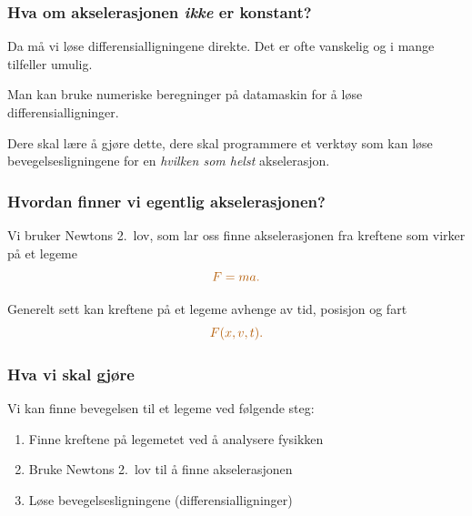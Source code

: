 \documentclass[english, 12pt]{beamer}
\newcommand{\alrt}{\color{AlertColor}}
\begin{document}
\begin{frame}
\frametitle{Hva om akselerasjonen \emph{ikke} er konstant?}

Da må vi løse differensialligningene direkte. Det er ofte vanskelig og i mange tilfeller umulig.

\vspace{1cm}

 {
Man kan bruke numeriske beregninger på datamaskin for å løse differensialligninger.
}

\vspace{1cm}

 {
Dere skal lære å gjøre dette, dere skal programmere et verktøy som kan løse bevegelsesligningene for en \emph{hvilken som helst} akselerasjon.
}
\end{frame}

\begin{frame}
\frametitle{Hvordan finner vi egentlig akselerasjonen?}

 {
	Vi bruker Newtons 2.\ lov, som lar oss finne akselerasjonen fra kreftene som virker på et legeme
	$$\alrt F = ma.$$
}

 {
	Generelt sett kan kreftene på et legeme avhenge av tid, posisjon og fart
	$$\alrt F(x,v,t).$$
}
\end{frame}

\begin{frame}
\frametitle{Hva vi skal gjøre }

Vi kan finne bevegelsen til et legeme ved følgende steg:
\begin{enumerate}
\item Finne kreftene på legemetet ved å analysere fysikken
\item Bruke Newtons 2.\ lov til å finne akselerasjonen
\item Løse bevegelsesligningene (differensialligninger)
\end{enumerate}
\end{frame}
\end{document}
